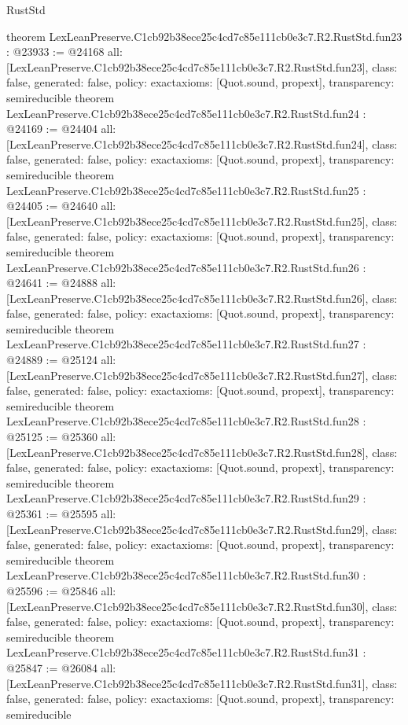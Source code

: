 \begin{lexlean}{RustStd}
\begin{coremodule}
{}
theorem LexLeanPreserve.C1cb92b38ece25c4cd7c85e111cb0e3c7.R2.RustStd.fun23 : @23933 := @24168 {
  all: [LexLeanPreserve.C1cb92b38ece25c4cd7c85e111cb0e3c7.R2.RustStd.fun23],
  class: false,
  generated: false,
  policy: exact{axioms: [Quot.sound, propext]},
  transparency: semireducible
}
theorem LexLeanPreserve.C1cb92b38ece25c4cd7c85e111cb0e3c7.R2.RustStd.fun24 : @24169 := @24404 {
  all: [LexLeanPreserve.C1cb92b38ece25c4cd7c85e111cb0e3c7.R2.RustStd.fun24],
  class: false,
  generated: false,
  policy: exact{axioms: [Quot.sound, propext]},
  transparency: semireducible
}
theorem LexLeanPreserve.C1cb92b38ece25c4cd7c85e111cb0e3c7.R2.RustStd.fun25 : @24405 := @24640 {
  all: [LexLeanPreserve.C1cb92b38ece25c4cd7c85e111cb0e3c7.R2.RustStd.fun25],
  class: false,
  generated: false,
  policy: exact{axioms: [Quot.sound, propext]},
  transparency: semireducible
}
theorem LexLeanPreserve.C1cb92b38ece25c4cd7c85e111cb0e3c7.R2.RustStd.fun26 : @24641 := @24888 {
  all: [LexLeanPreserve.C1cb92b38ece25c4cd7c85e111cb0e3c7.R2.RustStd.fun26],
  class: false,
  generated: false,
  policy: exact{axioms: [Quot.sound, propext]},
  transparency: semireducible
}
theorem LexLeanPreserve.C1cb92b38ece25c4cd7c85e111cb0e3c7.R2.RustStd.fun27 : @24889 := @25124 {
  all: [LexLeanPreserve.C1cb92b38ece25c4cd7c85e111cb0e3c7.R2.RustStd.fun27],
  class: false,
  generated: false,
  policy: exact{axioms: [Quot.sound, propext]},
  transparency: semireducible
}
theorem LexLeanPreserve.C1cb92b38ece25c4cd7c85e111cb0e3c7.R2.RustStd.fun28 : @25125 := @25360 {
  all: [LexLeanPreserve.C1cb92b38ece25c4cd7c85e111cb0e3c7.R2.RustStd.fun28],
  class: false,
  generated: false,
  policy: exact{axioms: [Quot.sound, propext]},
  transparency: semireducible
}
theorem LexLeanPreserve.C1cb92b38ece25c4cd7c85e111cb0e3c7.R2.RustStd.fun29 : @25361 := @25595 {
  all: [LexLeanPreserve.C1cb92b38ece25c4cd7c85e111cb0e3c7.R2.RustStd.fun29],
  class: false,
  generated: false,
  policy: exact{axioms: [Quot.sound, propext]},
  transparency: semireducible
}
theorem LexLeanPreserve.C1cb92b38ece25c4cd7c85e111cb0e3c7.R2.RustStd.fun30 : @25596 := @25846 {
  all: [LexLeanPreserve.C1cb92b38ece25c4cd7c85e111cb0e3c7.R2.RustStd.fun30],
  class: false,
  generated: false,
  policy: exact{axioms: [Quot.sound, propext]},
  transparency: semireducible
}
theorem LexLeanPreserve.C1cb92b38ece25c4cd7c85e111cb0e3c7.R2.RustStd.fun31 : @25847 := @26084 {
  all: [LexLeanPreserve.C1cb92b38ece25c4cd7c85e111cb0e3c7.R2.RustStd.fun31],
  class: false,
  generated: false,
  policy: exact{axioms: [Quot.sound, propext]},
  transparency: semireducible
}
\end{coremodule}
\end{lexlean}
